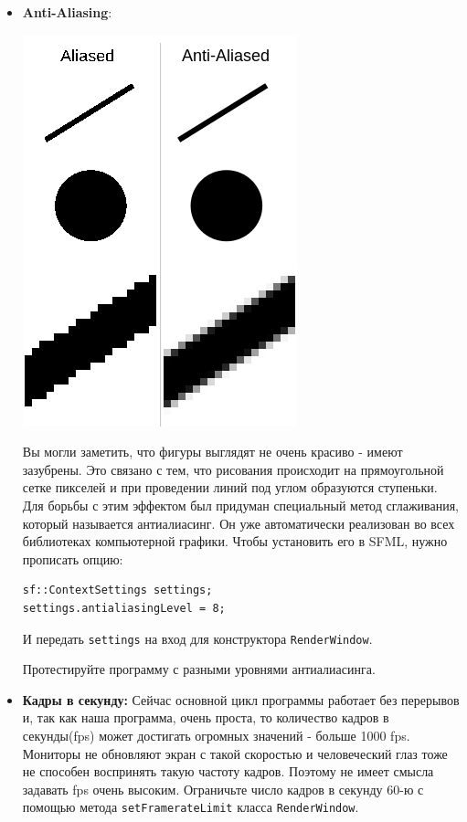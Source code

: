 \documentclass{article}
\begin{document}
\begin{itemize}
\item \textbf{Anti-Aliasing}:
\begin{multicols}{2}
\begin{center}
\includegraphics[scale=0.5]{../images/anti-aliasing.png}
\end{center}
Вы могли заметить, что фигуры выглядят не очень красиво - имеют зазубрены. Это связано с тем, что рисования происходит на прямоугольной сетке пикселей и при проведении линий под углом образуются ступеньки. Для борьбы с этим эффектом был придуман специальный метод сглаживания, который называется антиалиасинг. Он уже автоматически реализован во всех библиотеках компьютерной графики. Чтобы установить его в SFML, нужно прописать опцию:
\begin{lstlisting}
sf::ContextSettings settings;
settings.antialiasingLevel = 8;
\end{lstlisting}
И передать \texttt{settings} на вход для конструктора \texttt{RenderWindow}.
\end{multicols}
Протестируйте программу с разными уровнями антиалиасинга.

\item \textbf{Кадры в секунду:} Сейчас основной цикл программы работает без перерывов и, так как наша программа, очень проста, то количество кадров в секунды(fps) может достигать огромных значений - больше 1000 fps. Мониторы не обновляют экран с такой скоростью и человеческий глаз тоже не способен воспринять такую частоту кадров. Поэтому не имеет смысла задавать fps очень высоким. Ограничьте число кадров в секунду 60-ю с помощью метода \texttt{setFramerateLimit} класса \texttt{RenderWindow}.


\end{itemize}
\end{document}
